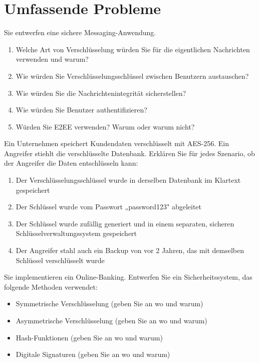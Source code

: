 \documentclass[11pt,a4paper]{report}
\begin{document}
\section{Umfassende Probleme}

\begin{ex}
Sie entwerfen eine sichere Messaging-Anwendung.

\begin{enumerate}[label=\alph*)]
    \item Welche Art von Verschlüsselung würden Sie für die eigentlichen Nachrichten verwenden und warum?
    \item Wie würden Sie Verschlüsselungsschlüssel zwischen Benutzern austauschen?
    \item Wie würden Sie die Nachrichtenintegrität sicherstellen?
    \item Wie würden Sie Benutzer authentifizieren?
    \item Würden Sie E2EE verwenden? Warum oder warum nicht?
\end{enumerate}
\end{ex}

\begin{ex}
Ein Unternehmen speichert Kundendaten verschlüsselt mit AES-256. Ein Angreifer stiehlt die verschlüsselte Datenbank. Erklären Sie für jedes Szenario, ob der Angreifer die Daten entschlüsseln kann:

\begin{enumerate}[label=\alph*)]
    \item Der Verschlüsselungsschlüssel wurde in derselben Datenbank im Klartext gespeichert
    \item Der Schlüssel wurde vom Passwort „password123" abgeleitet
    \item Der Schlüssel wurde zufällig generiert und in einem separaten, sicheren Schlüsselverwaltungssystem gespeichert
    \item Der Angreifer stahl auch ein Backup von vor 2 Jahren, das mit demselben Schlüssel verschlüsselt wurde
\end{enumerate}
\end{ex}

\begin{ex}
Sie implementieren ein Online-Banking. Entwerfen Sie ein Sicherheitssystem, das folgende Methoden verwendet:
\begin{itemize}
    \item Symmetrische Verschlüsselung (geben Sie an wo und warum)
    \item Asymmetrische Verschlüsselung (geben Sie an wo und warum)
    \item Hash-Funktionen (geben Sie an wo und warum)
    \item Digitale Signaturen (geben Sie an wo und warum)
\end{itemize}
\end{ex}
\end{document}
